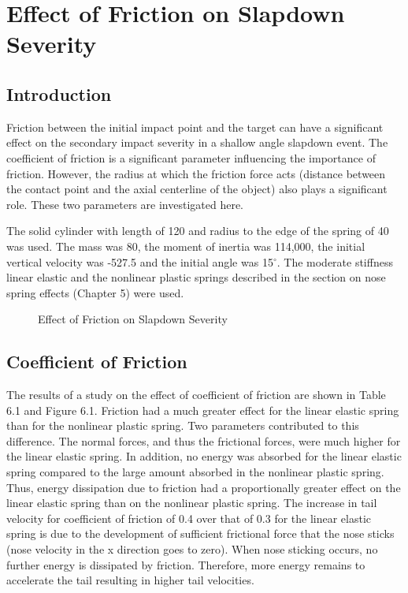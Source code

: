 \chapter{Effect of Friction on Slapdown Severity}

\section{Introduction}

     Friction between the initial impact point and the target can have
a significant effect on the secondary impact severity in a
shallow angle slapdown event.  The coefficient of friction
is a significant parameter influencing the importance of friction.
However, the radius at which the friction force acts (distance between
the contact point and the axial centerline of the object) also plays a
significant role.  These two parameters are investigated here.

     The solid cylinder with length of 120 and radius to the edge of
the spring of 40 was used.  The mass was 80, the moment of inertia was
114,000, the initial vertical velocity was -527.5 and the initial
angle was 15$^\circ$.  The moderate stiffness linear elastic and the
nonlinear plastic springs described in the section on nose spring
effects (Chapter 5) were used.

\begin{figure}
\vspace{3.5 in}
\caption{Effect of Friction on Slapdown Severity}
\end{figure}

\section{Coefficient of Friction}

     The results of a study on the effect of coefficient of friction
are shown in Table 6.1 and Figure 6.1.
Friction had a much
greater effect for the linear elastic spring than for the nonlinear
plastic spring.  Two parameters contributed to this difference.  The
normal forces, and thus the frictional forces, were much higher for the
linear elastic spring. In addition, no energy was absorbed for the
linear elastic spring compared to the large amount absorbed in the
nonlinear plastic spring. Thus, energy dissipation due to friction
had a proportionally greater effect on the linear
elastic spring than on the nonlinear plastic spring. The increase in
tail velocity for coefficient of friction of 0.4 over that of 0.3 for
the linear elastic spring is due to the development of sufficient
frictional force that the nose sticks (nose velocity in the x
direction goes to zero).  When nose sticking occurs, no further energy
is dissipated by friction.  Therefore, more energy remains to
accelerate the tail resulting in higher tail velocities.


